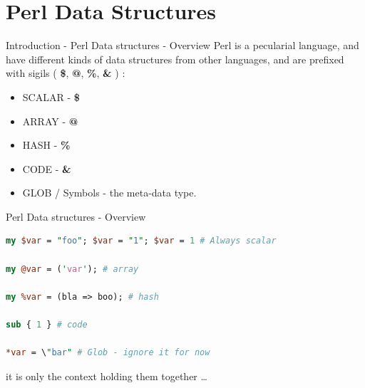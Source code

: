 \documentclass[10pt]{beamer}
\begin{document}
\section{Perl Data Structures}

\begin{frame}[fragile]{Introduction - Perl Data structures - Overview}
  Perl is a pecularial language, and have different kinds of data structures from other languages, and are prefixed with sigils ( \textbf{\$}, \textbf{@}, \textbf{\%}, \textbf{\*} \textbf{\&} ) :
  
  \begin{itemize}
      \item SCALAR - \textbf{\$}
      \item ARRAY - \textbf{@}
      \item HASH -  \textbf{\%}
      \item CODE -  \textbf{\&}
      \item GLOB  \textbf{\*} / Symbols - the meta-data type.
  \end{itemize}
\end{frame}

\begin{frame}[fragile]{Perl Data structures - Overview}

\begin{lstlisting}[language=perl]
my $var = "foo"; $var = "1"; $var = 1 # Always scalar

my @var = ('var'); # array

my %var = (bla => boo); # hash

sub { 1 } # code

*var = \"bar" # Glob - ignore it for now
\end{lstlisting}

  it is only the context holding them together \ldots
\end{frame}
\end{document}
